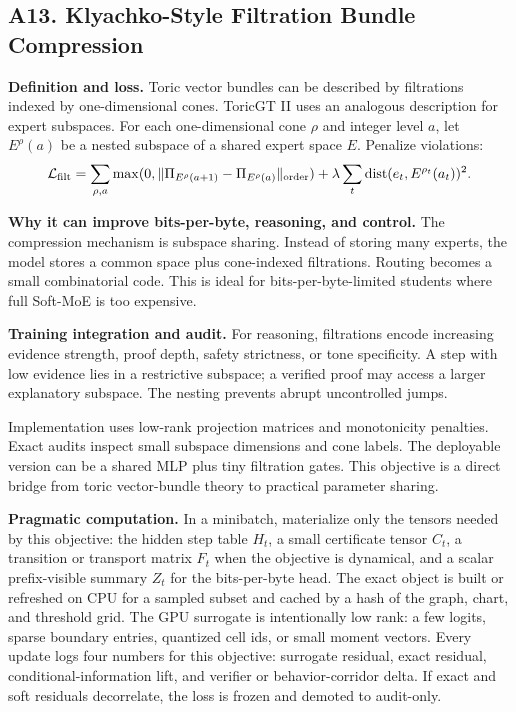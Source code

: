 \documentclass[10pt]{article}
\newcommand{\dist}{\operatorname{dist}}
\newcommand{\loss}{\mathcal{L}}
\numberwithin{equation}{section}
\begin{document}
\subsection{A13. Klyachko-Style Filtration Bundle Compression}
\noindent\textbf{Definition and loss.} Toric vector bundles can be described by filtrations indexed by one-dimensional cones. ToricGT II uses an analogous description for expert subspaces. For each one-dimensional cone $\rho$ and integer level $a$, let $E^\rho(a)$ be a nested subspace of a shared expert space $E$. Penalize violations:
\[
\loss_{\rm filt}=\sum_{\rho,a}\max(0,\|\Pi_{E^\rho(a+1)}-\Pi_{E^\rho(a)}\|_{\rm order})+\lambda\sum_t\dist(e_t,E^{\rho_t}(a_t))^2.
\]

\noindent\textbf{Why it can improve bits-per-byte, reasoning, and control.} The compression mechanism is subspace sharing. Instead of storing many experts, the model stores a common space plus cone-indexed filtrations. Routing becomes a small combinatorial code. This is ideal for bits-per-byte-limited students where full Soft-MoE is too expensive.

\noindent\textbf{Training integration and audit.} For reasoning, filtrations encode increasing evidence strength, proof depth, safety strictness, or tone specificity. A step with low evidence lies in a restrictive subspace; a verified proof may access a larger explanatory subspace. The nesting prevents abrupt uncontrolled jumps.

Implementation uses low-rank projection matrices and monotonicity penalties. Exact audits inspect small subspace dimensions and cone labels. The deployable version can be a shared MLP plus tiny filtration gates. This objective is a direct bridge from toric vector-bundle theory to practical parameter sharing.

\noindent\textbf{Pragmatic computation.} In a minibatch, materialize only the tensors needed by this objective: the hidden step table $H_t$, a small certificate tensor $C_t$, a transition or transport matrix $F_t$ when the objective is dynamical, and a scalar prefix-visible summary $Z_t$ for the bits-per-byte head. The exact object is built or refreshed on CPU for a sampled subset and cached by a hash of the graph, chart, and threshold grid. The GPU surrogate is intentionally low rank: a few logits, sparse boundary entries, quantized cell ids, or small moment vectors. Every update logs four numbers for this objective: surrogate residual, exact residual, conditional-information lift, and verifier or behavior-corridor delta. If exact and soft residuals decorrelate, the loss is frozen and demoted to audit-only.
\end{document}
